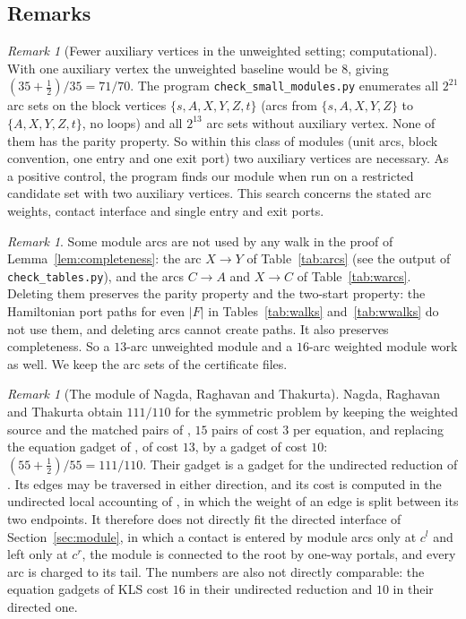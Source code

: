 \documentclass[11pt]{amsart}
\theoremstyle{definition}
\theoremstyle{remark}
\newtheorem{remark}[theorem]{Remark}
\numberwithin{equation}{section}
\begin{document}
\subsection{Remarks}

\begin{remark}[Fewer auxiliary vertices in the unweighted setting; computational]\label{rem:small}
With one auxiliary vertex the unweighted baseline would be $8$, giving $(35+\frac12)/35=71/70$. The program \texttt{check\_small\_modules.py} enumerates all $2^{21}$ arc sets on the block vertices $\{s,A,X,Y,Z,t\}$ (arcs from $\{s,A,X,Y,Z\}$ to $\{A,X,Y,Z,t\}$, no loops) and all $2^{13}$ arc sets without auxiliary vertex. None of them has the parity property. So within this class of modules (unit arcs, block convention, one entry and one exit port) two auxiliary vertices are necessary. As a positive control, the program finds our module when run on a restricted candidate set with two auxiliary vertices. This search concerns the stated arc weights, contact interface and single entry and exit ports.
\end{remark}

\begin{remark}\label{rem:unused}
Some module arcs are not used by any walk in the proof of Lemma~\ref{lem:completeness}: the arc $X\to Y$ of Table~\ref{tab:arcs} (see the output of \texttt{check\_tables.py}), and the arcs $C\to A$ and $X\to C$ of Table~\ref{tab:warcs}. Deleting them preserves the parity property and the two-start property: the Hamiltonian port paths for even $|F|$ in Tables~\ref{tab:walks} and~\ref{tab:wwalks} do not use them, and deleting arcs cannot create paths. It also preserves completeness. So a $13$-arc unweighted module and a $16$-arc weighted module work as well. We keep the arc sets of the certificate files.
\end{remark}

\begin{remark}[The module of Nagda, Raghavan and Thakurta]\label{rem:nrt}
Nagda, Raghavan and Thakurta \cite{NRT26} obtain $111/110$ for the symmetric problem by keeping the weighted source and the matched pairs of \cite{CC22}, $15$ pairs of cost $3$ per equation, and replacing the equation gadget of \cite{CC22}, of cost $13$, by a gadget of cost $10$: $(55+\frac12)/55=111/110$. Their gadget is a gadget for the undirected reduction of \cite{CC22}. Its edges may be traversed in either direction, and its cost is computed in the undirected local accounting of \cite{CC22}, in which the weight of an edge is split between its two endpoints. It therefore does not directly fit the directed interface of Section~\ref{sec:module}, in which a contact is entered by module arcs only at $c^l$ and left only at $c^r$, the module is connected to the root by one-way portals, and every arc is charged to its tail. The numbers are also not directly comparable: the equation gadgets of KLS cost $16$ in their undirected reduction and $10$ in their directed one.
\end{remark}
\end{document}
